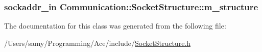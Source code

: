 \subsubsection[{m\+\_\+structure}]{\setlength{\rightskip}{0pt plus 5cm}sockaddr\+\_\+in Communication\+::\+Socket\+Structure\+::m\+\_\+structure\hspace{0.3cm}{\ttfamily [private]}}\label{class_communication_1_1_socket_structure_a34c100e39a27e68a5cc3235b0c552e27}


The documentation for this class was generated from the following file\+:\begin{DoxyCompactItemize}
\item 
/\+Users/samy/\+Programming/\+Ace/include/\hyperlink{_socket_structure_8h}{Socket\+Structure.\+h}\end{DoxyCompactItemize}
